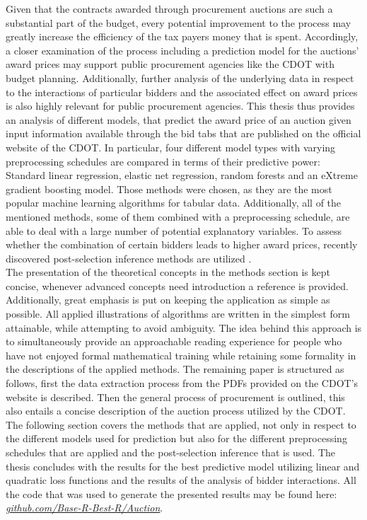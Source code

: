 \documentclass[a4paper,12pt, headsepline]{scrartcl}
\numberwithin{equation}{section}
\begin{document}
Given that the contracts awarded through procurement auctions are such a substantial part of the budget, every potential improvement to the process may greatly increase the efficiency of the tax payers money that is spent. Accordingly, a closer examination of the process including a prediction model for the auctions' award prices may support public procurement agencies like the CDOT with budget planning. Additionally, further analysis of the underlying data in respect to the interactions of particular bidders and the associated effect on award prices is also highly relevant for public procurement agencies. This thesis thus provides an analysis of different models, that predict the award price of an auction given input information available through the bid tabs that are published on the official website of the CDOT. In particular, four different model types with varying preprocessing schedules are compared in terms of their predictive power: Standard linear regression, elastic net regression, random forests and an eXtreme gradient boosting model. Those methods were chosen, as they are the most popular machine learning algorithms for tabular data. Additionally, all of the mentioned methods, some of them combined with a preprocessing schedule, are able to deal with a large number of potential explanatory variables. To assess whether the combination of certain bidders leads to higher award prices, recently discovered post-selection inference methods are utilized \citep{selectiveInference}.\\
The presentation of the theoretical concepts in the methods section is kept concise, whenever advanced concepts need introduction a reference is provided. Additionally, great emphasis is put on keeping the application as simple as possible. All applied illustrations of algorithms are written in the simplest form attainable, while attempting to avoid ambiguity. The idea behind this approach is to simultaneously provide an approachable reading experience for people who have not enjoyed formal mathematical training while retaining some formality in the descriptions of the applied methods.
The remaining paper is structured as follows, first the data extraction process from the PDFs provided on the CDOT's website is described. Then the general process of procurement is outlined, this also entails a concise description of the auction process utilized by the CDOT. The following section covers the methods that are applied, not only in respect to the different models used for prediction but also for the different preprocessing schedules that are applied and the post-selection inference that is used. The thesis concludes with the results for the best predictive model utilizing linear and quadratic loss functions and the results of the analysis of bidder interactions. All the code that was used to generate the presented results may be found here: \href{https://github.com/Base-R-Best-R/Auction}{\textit{github.com/Base-R-Best-R/Auction}}.
\newpage
\end{document}
